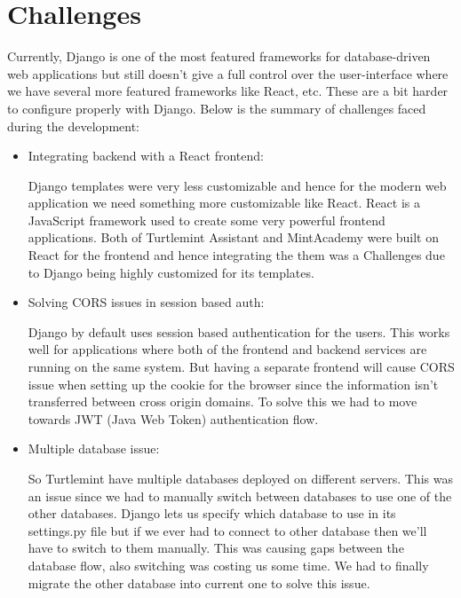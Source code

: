 \chapter{Challenges}
Currently, Django is one of the most featured frameworks for database-driven
web applications but still doesn't give a full control over the user-interface
where we have several more featured frameworks like React, etc. These are
a bit harder to configure properly with Django. Below is the summary of
challenges faced during the development:

\begin{itemize}
    \item Integrating backend with a React frontend:
    
    Django templates were very less customizable and hence for the modern
    web application we need something more customizable like React. React is
    a JavaScript framework used to create some very powerful frontend
    applications. Both of Turtlemint Assistant and MintAcademy were built on
    React for the frontend and hence integrating the them was a Challenges
    due to Django being highly customized for its templates.

    \item Solving CORS issues in session based auth:
    
    Django by default uses session based authentication for the users. This
    works well for applications where both of the frontend and backend services
    are running on the same system. But having a separate frontend will cause
    CORS issue when setting up the cookie for the browser since the information
    isn't transferred between cross origin domains. To solve this we had to
    move towards JWT (Java Web Token) authentication flow.

    \item Multiple database issue:
    
    So Turtlemint have multiple databases deployed on different servers. This
    was an issue since we had to manually switch between databases to use one
    of the other databases. Django lets us specify which database to use in
    its settings.py file but if we ever had to connect to other database then
    we'll have to switch to them manually. This was causing gaps between the
    database flow, also switching was costing us some time. We had to finally
    migrate the other database into current one to solve this issue.
\end{itemize}
